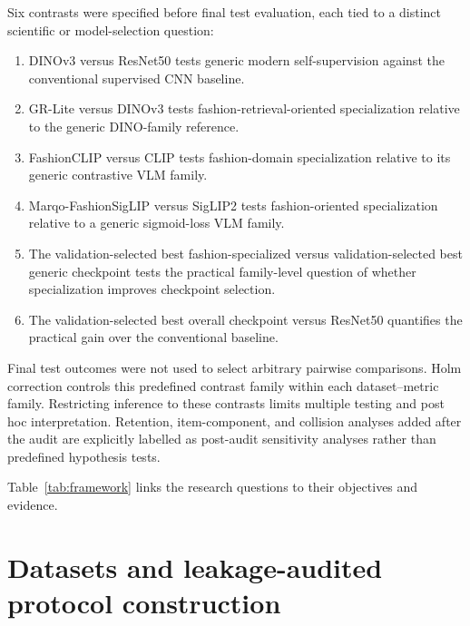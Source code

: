 \documentclass[pdflatex,sn-mathphys-num,iicol]{sn-jnl}
\begin{document}
Six contrasts were specified before final test evaluation, each tied to a distinct scientific or model-selection question:
\begin{enumerate}
\item DINOv3 versus ResNet50 tests generic modern self-supervision against the conventional supervised CNN baseline.
\item GR-Lite versus DINOv3 tests fashion-retrieval-oriented specialization relative to the generic DINO-family reference.
\item FashionCLIP versus CLIP tests fashion-domain specialization relative to its generic contrastive VLM family.
\item Marqo-FashionSigLIP versus SigLIP2 tests fashion-oriented specialization relative to a generic sigmoid-loss VLM family.
\item The validation-selected best fashion-specialized versus validation-selected best generic checkpoint tests the practical family-level question of whether specialization improves checkpoint selection.
\item The validation-selected best overall checkpoint versus ResNet50 quantifies the practical gain over the conventional baseline.
\end{enumerate}
Final test outcomes were not used to select arbitrary pairwise comparisons. Holm correction controls this predefined contrast family within each dataset--metric family. Restricting inference to these contrasts limits multiple testing and post hoc interpretation. Retention, item-component, and collision analyses added after the audit are explicitly labelled as post-audit sensitivity analyses rather than predefined hypothesis tests.



Table~\ref{tab:framework} links the research questions to their objectives and evidence.

\section{Datasets and leakage-audited protocol construction}\label{sec:datasets}
\end{document}
